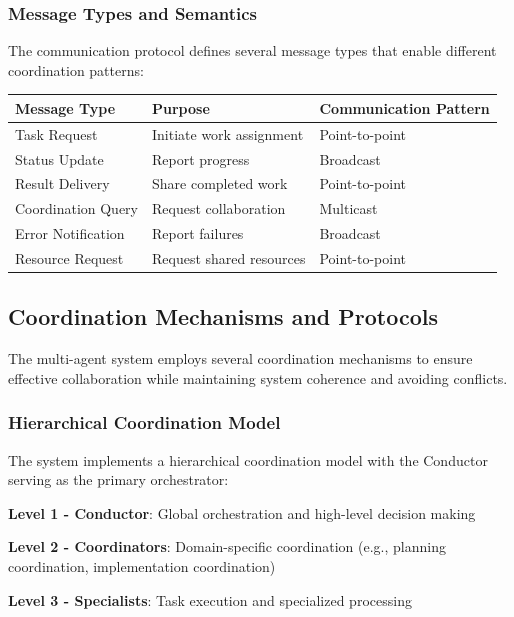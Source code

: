 \subsubsection*{Message Types and Semantics}

The communication protocol defines several message types that enable different coordination patterns:

\begin{center}
\begin{tabular}{@{}lll@{}}
\toprule
\textbf{Message Type} & \textbf{Purpose} & \textbf{Communication Pattern} \\
\midrule
Task Request & Initiate work assignment & Point-to-point \\
Status Update & Report progress & Broadcast \\
Result Delivery & Share completed work & Point-to-point \\
Coordination Query & Request collaboration & Multicast \\
Error Notification & Report failures & Broadcast \\
Resource Request & Request shared resources & Point-to-point \\
\bottomrule
\end{tabular}
\end{center}

\subsection*{Coordination Mechanisms and Protocols}

The multi-agent system employs several coordination mechanisms to ensure effective collaboration while maintaining system coherence and avoiding conflicts.

\subsubsection*{Hierarchical Coordination Model}

The system implements a hierarchical coordination model with the Conductor serving as the primary orchestrator:

\begin{compactlist}
    \item \textbf{Level 1 - Conductor}: Global orchestration and high-level decision making
    \item \textbf{Level 2 - Coordinators}: Domain-specific coordination (e.g., planning coordination, implementation coordination)
    \item \textbf{Level 3 - Specialists}: Task execution and specialized processing
\end{compactlist}

